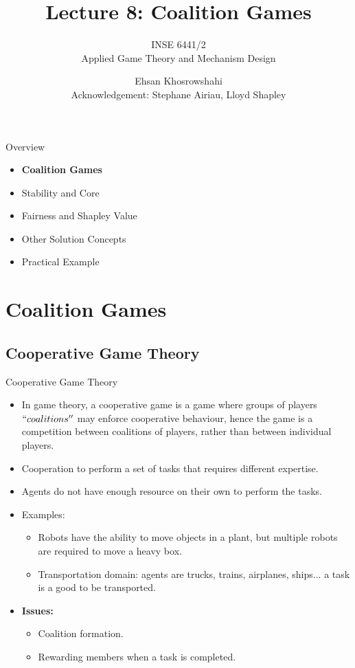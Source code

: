 \documentclass{beamer}
\title[Lecture 8: Coalition Games]{Lecture 8: Coalition Games}
\author{INSE 6441/2\\ \vspace{0.2cm} Applied Game Theory and Mechanism Design}
\institute{Department of Computer Science and Software Engineering\\Concordia University}
\date{Ehsan Khosrowshahi \\ \small{Acknowledgement: Stephane Airiau, Lloyd Shapley}}
\begin{document}
\begin{frame}
\titlepage
\end{frame}

\begin{frame}{Overview}
    \begin{itemize}
     	\itemsep=.5cm
    	\item {\bf Coalition Games}
    	\item Stability and Core
    	\item Fairness and Shapley Value
    	\item Other Solution Concepts
        \item Practical Example
    \end{itemize}
\end{frame}


\section{Coalition Games}
\subsection{Cooperative Game Theory}

\begin{frame}{Cooperative Game Theory}
  \begin{itemize}
     \item In game theory, a cooperative game is a game where groups of players $``coalitions''$ may enforce cooperative behaviour, hence the game is a competition between coalitions of players, rather than between individual players.
    \item Cooperation to perform a set of tasks that requires different expertise.
    \item Agents do not have enough resource on their own to perform the tasks.
    \item Examples:
    \begin{itemize}
        \item Robots have the ability to move objects in a plant, but multiple robots are required to move a heavy box.
        \item Transportation domain: agents are trucks, trains, airplanes, ships... a task is a good to be transported.
    \end{itemize}
    \item \textbf{Issues:}
        \begin{itemize}
            \item Coalition formation.
            \item Rewarding members when a task is completed.
        \end{itemize}
  \end{itemize}
\end{frame}
\end{document}
